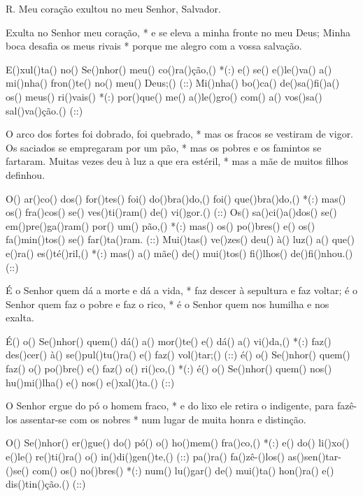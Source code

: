 

R. Meu coração exultou no meu Senhor, Salvador.

Exulta no Senhor meu coração, *
e se eleva a minha fronte no meu Deus;
Minha boca desafia os meus rivais *
porque me alegro com a vossa salvação.

E()xul()ta() no() Se()nhor() meu() co()ra()ção,() *(:)
e() se() e()le()va() a() mi()nha() fron()te() no() meu() Deus;() (::)
Mi()nha() bo()ca() de()sa()fi()a() os() meus() ri()vais() *(:)
por()que() me() a()le()gro() com() a() vos()sa() sal()va()ção.() (::)

O arco dos fortes foi dobrado, foi quebrado, *
mas os fracos se vestiram de vigor.
Os saciados se empregaram por um pão, *
mas os pobres e os famintos se fartaram.
Muitas vezes deu à luz a que era estéril, *
mas a mãe de muitos filhos definhou.

O() ar()co() dos() for()tes() foi() do()bra()do,() foi() que()bra()do,() *(:)
mas() os() fra()cos() se() ves()ti()ram() de() vi()gor.() (::)
Os() sa()ci()a()dos() se() em()pre()ga()ram() por() um() pão,() *(:)
mas() os() po()bres() e() os() fa()min()tos() se() far()ta()ram. (::)
Mui()tas() ve()zes() deu() à() luz() a() que() e()ra() es()té()ril,() *(:)
mas() a() mãe() de() mui()tos() fi()lhos() de()fi()nhou.() (::)

É o Senhor quem dá a morte e dá a vida, *
faz descer à sepultura e faz voltar;
é o Senhor quem faz o pobre e faz o rico, *
é o Senhor quem nos humilha e nos exalta.

É() o() Se()nhor() quem() dá() a() mor()te() e() dá() a() vi()da,() *(:)
faz() des()cer() à() se()pul()tu()ra() e() faz() vol()tar;() (::)
é() o() Se()nhor() quem() faz() o() po()bre() e() faz() o() ri()co,() *(:)
é() o() Se()nhor() quem() nos() hu()mi()lha() e() nos() e()xal()ta.() (::)

O Senhor ergue do pó o homem fraco, *
e do lixo ele retira o indigente,
para fazê-los assentar-se com os nobres *
num lugar de muita honra e distinção.

O() Se()nhor() er()gue() do() pó() o() ho()mem() fra()co,() *(:)
e() do() li()xo() e()le() re()ti()ra() o() in()di()gen()te,() (::)
pa()ra() fa()zê-()los() as()sen()tar-()se() com() os() no()bres() *(:)
num() lu()gar() de() mui()ta() hon()ra() e() dis()tin()ção.() (::)